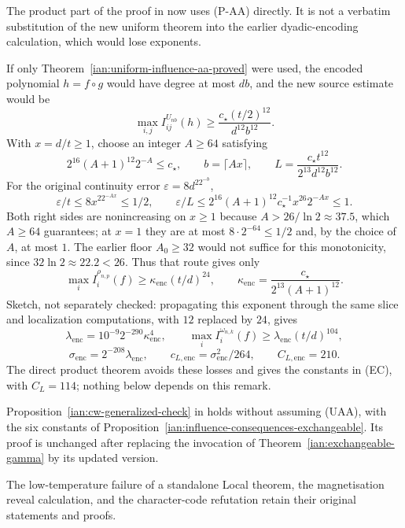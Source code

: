 \begin{remark}
\label{ian:influence-consequences-dyadic}
The product part of the proof in
 now uses
(P-AA) directly. It is not a verbatim substitution of the new uniform
theorem into the earlier dyadic-encoding calculation, which would
lose exponents.

If only Theorem~\ref{ian:uniform-influence-aa-proved} were used,
the encoded polynomial \(h=f\circ g\) would have degree at most
\(db\), and the new source estimate would be
\[
 \max_{i,j}I_{ij}^{U_{nb}}(h)
 \ge\frac{c_\star(t/2)^{12}}{d^{12}b^{12}}.
\]
With \(x=d/t\ge1\), choose an integer \(A\ge64\) satisfying
\[
 2^{16}(A+1)^{12}2^{-A}\le c_\star,
 \qquad b=\lceil Ax\rceil,
 \qquad
 L=\frac{c_\star t^{12}}{2^{13}d^{12}b^{12}}.
\]
For the original continuity error \(\varepsilon=8d^22^{-b}\),
\[
 \varepsilon/t\le8x^22^{-Ax}\le1/2,\qquad
 \varepsilon/L
 \le2^{16}(A+1)^{12}c_\star^{-1}x^{26}2^{-Ax}\le1.
\]
Both right sides are nonincreasing on \(x\ge1\) because
\(A>26/\ln2\approx37.5\), which \(A\ge64\) guarantees; at \(x=1\)
they are at most \(8\cdot2^{-64}\le1/2\) and, by the choice of \(A\),
at most \(1\). The earlier floor \(A_0\ge32\) would not suffice for
this monotonicity, since \(32\ln2\approx22.2<26\).
Thus that route gives only
\[
 \max_i I_i^{\rho_{n,p}}(f)
 \ge\kappa_{\mathrm{enc}}(t/d)^{24},
 \qquad
 \kappa_{\mathrm{enc}}
 =\frac{c_\star}{2^{13}(A+1)^{12}}.
\]
Sketch, not separately checked: propagating this exponent through
the same slice and localization computations, with \(12\) replaced
by \(24\), gives
\[
 \lambda_{\mathrm{enc}}
 =10^{-9}2^{-290}\kappa_{\mathrm{enc}}^4,
 \qquad
 \max_iI_i^{\omega_{n,k}}(f)
 \ge\lambda_{\mathrm{enc}}(t/d)^{104},
\]
\[
 \sigma_{\mathrm{enc}}=2^{-208}\lambda_{\mathrm{enc}},
 \qquad
 c_{L,\mathrm{enc}}=\sigma_{\mathrm{enc}}^2/264,
 \qquad C_{L,\mathrm{enc}}=210.
\]
The direct product theorem avoids these losses and gives the
constants in (EC), with \(C_L=114\); nothing below depends on this
remark.
\end{remark}

\begin{corollary}
\label{ian:influence-consequences-cw}
Proposition~\ref{ian:cw-generalized-check} in
 holds without
assuming (UAA), with the six constants of
Proposition~\ref{ian:influence-consequences-exchangeable}.
Its proof is unchanged after replacing the invocation of
Theorem~\ref{ian:exchangeable-gamma} by its updated version.

The low-temperature failure of a standalone Local theorem, the
magnetisation reveal calculation, and the character-code refutation
retain their original statements and proofs.
\end{corollary}

